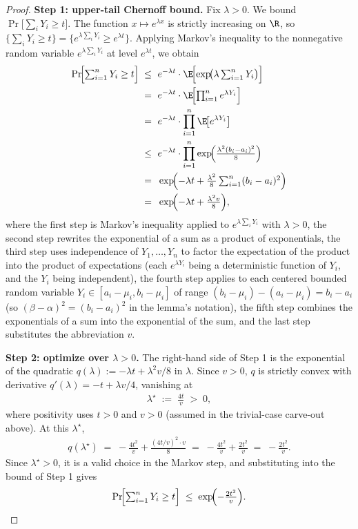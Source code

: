 \begin{proof}
\smallskip\noindent\textbf{Step 1: upper-tail Chernoff bound.}
Fix $\lambda > 0$. We bound $\Pr\bigl[\sum_i Y_i \ge t\bigr]$. The function
$x \mapsto e^{\lambda x}$ is strictly increasing on $\R$, so
$\{\sum_i Y_i \ge t\} = \{e^{\lambda \sum_i Y_i} \ge e^{\lambda t}\}$. Applying
Markov's inequality to the nonnegative random variable $e^{\lambda \sum_i Y_i}$ at
level $e^{\lambda t}$, we obtain
\begin{align*}
\Pr\!\Bigl[\textstyle\sum_{i=1}^n Y_i \ge t\Bigr]
\;\le\; & ~ e^{-\lambda t} \cdot \E\!\Bigl[\exp\!\bigl(\lambda \textstyle\sum_{i=1}^n Y_i\bigr)\Bigr] \\
\;=\; & ~ e^{-\lambda t} \cdot \E\!\Bigl[\textstyle\prod_{i=1}^n e^{\lambda Y_i}\Bigr] \\
\;=\; & ~ e^{-\lambda t} \cdot \prod_{i=1}^n \E\!\bigl[e^{\lambda Y_i}\bigr] \\
\;\le\; & ~ e^{-\lambda t} \cdot \prod_{i=1}^n \exp\!\Bigl(\tfrac{\lambda^2 (b_i - a_i)^2}{8}\Bigr) \\
\;=\; & ~ \exp\!\Bigl(-\lambda t + \tfrac{\lambda^2}{8} \textstyle\sum_{i=1}^n (b_i - a_i)^2\Bigr) \\
\;=\; & ~ \exp\!\Bigl(-\lambda t + \tfrac{\lambda^2 v}{8}\Bigr),
\end{align*}
where the first step is Markov's inequality applied to $e^{\lambda \sum_i Y_i}$
with $\lambda > 0$, the second step rewrites the exponential of a sum as a product
of exponentials, the third step uses independence of $Y_1, \ldots, Y_n$ to
factor the expectation of the product into the product of expectations (each
$e^{\lambda Y_i}$ being a deterministic function of $Y_i$, and the $Y_i$ being
independent), the fourth step applies  to each centered
bounded random variable $Y_i \in [a_i - \mu_i, b_i - \mu_i]$ of range
$(b_i - \mu_i) - (a_i - \mu_i) = b_i - a_i$ (so $(\beta - \alpha)^2 = (b_i - a_i)^2$
in the lemma's notation), the fifth step combines the exponentials of a sum into
the exponential of the sum, and the last step substitutes the abbreviation $v$.

\smallskip\noindent\textbf{Step 2: optimize over $\lambda > 0$.}
The right-hand side of Step 1 is the exponential of the quadratic
$q(\lambda) := -\lambda t + \lambda^2 v / 8$ in $\lambda$. Since $v > 0$, $q$ is
strictly convex with derivative $q'(\lambda) = -t + \lambda v / 4$, vanishing at
\begin{align*}
\lambda^\star \;:=\; \frac{4 t}{v} \;>\; 0,
\end{align*}
where positivity uses $t > 0$ and $v > 0$ (assumed in the trivial-case carve-out
above). At this $\lambda^\star$,
\begin{align*}
q(\lambda^\star)
\;=\; -\frac{4t^2}{v} + \frac{(4t / v)^2 \cdot v}{8}
\;=\; -\frac{4t^2}{v} + \frac{2t^2}{v}
\;=\; -\frac{2t^2}{v}.
\end{align*}
Since $\lambda^\star > 0$, it is a valid choice in the Markov step, and substituting
into the bound of Step 1 gives
\begin{align}\label{eq:upper-tail}
\Pr\!\Bigl[\textstyle\sum_{i=1}^n Y_i \ge t\Bigr]
\;\le\; \exp\!\Bigl(- \tfrac{2 t^2}{v}\Bigr).
\end{align}


\end{proof}
